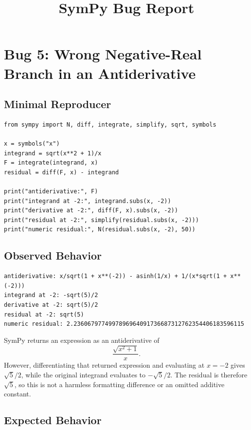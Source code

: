 \documentclass[11pt]{article}
\title{SymPy Bug Report}
\author{}
\date{}
\begin{document}
\maketitle

\section{Bug 5: Wrong Negative-Real Branch in an Antiderivative}

\subsection{Minimal Reproducer}

\medskip

\begin{lstlisting}[style=bugpython]
from sympy import N, diff, integrate, simplify, sqrt, symbols

x = symbols("x")
integrand = sqrt(x**2 + 1)/x
F = integrate(integrand, x)
residual = diff(F, x) - integrand

print("antiderivative:", F)
print("integrand at -2:", integrand.subs(x, -2))
print("derivative at -2:", diff(F, x).subs(x, -2))
print("residual at -2:", simplify(residual.subs(x, -2)))
print("numeric residual:", N(residual.subs(x, -2), 50))
\end{lstlisting}

\subsection{Observed Behavior}

\medskip

\begin{lstlisting}[style=bugpython]
antiderivative: x/sqrt(1 + x**(-2)) - asinh(1/x) + 1/(x*sqrt(1 + x**(-2)))
integrand at -2: -sqrt(5)/2
derivative at -2: sqrt(5)/2
residual at -2: sqrt(5)
numeric residual: 2.2360679774997896964091736687312762354406183596115
\end{lstlisting}

SymPy returns an expression as an antiderivative of
\[
    \frac{\sqrt{x^2 + 1}}{x}.
\]
However, differentiating that returned expression and evaluating at \(x=-2\)
gives \(\sqrt{5}/2\), while the original integrand evaluates to
\(-\sqrt{5}/2\). The residual is therefore \(\sqrt{5}\), so this is not a
harmless formatting difference or an omitted additive constant.

\subsection{Expected Behavior}
\end{document}
